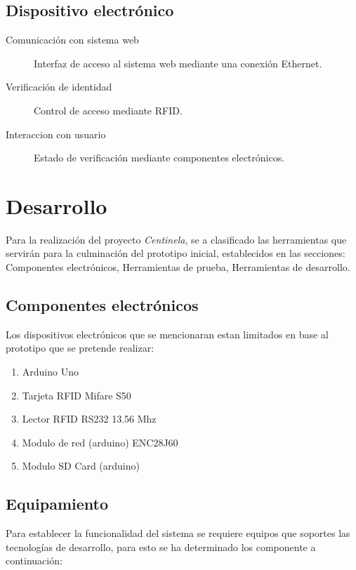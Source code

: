 \documentclass[11pt,twocolumn]{article}
\begin{document}
	\subsection{Dispositivo electr\'onico}
	
	 \begin{description}
		 \item[Comunicaci\'on con sistema web] Interfaz de acceso al sistema web mediante una conexi\'on Ethernet.
		 \item[Verificaci\'on de identidad] Control de acceso mediante RFID.
		 \item[Interaccion con usuario] Estado de verificaci\'on mediante componentes electr\'onicos.
	 \end{description}			

\section{Desarrollo}

Para la realizaci\'on del proyecto \textit{Centinela}, se a clasificado las herramientas que servir\'an para la culminaci\'on del prototipo inicial, establecidos en las secciones: Componentes electr\'onicos, Herramientas de prueba, Herramientas de desarrollo.

	\subsection{Componentes electr\'onicos}

	Los  dispositivos electr\'onicos que se mencionaran estan limitados en base al prototipo que se pretende realizar:\\
	
	\begin{enumerate}
		\item Arduino Uno
		\item Tarjeta RFID Mifare S50
		\item Lector RFID RS232 13.56 Mhz
		\item Modulo de red (arduino) ENC28J60
		\item Modulo SD Card (arduino)
	\end{enumerate}
	
	\subsection{Equipamiento}

	Para establecer la funcionalidad del sistema se requiere equipos que soportes las tecnolog\'ias de desarrollo, para esto se ha determinado los componente a continuaci\'on: \\
	
\end{document}

